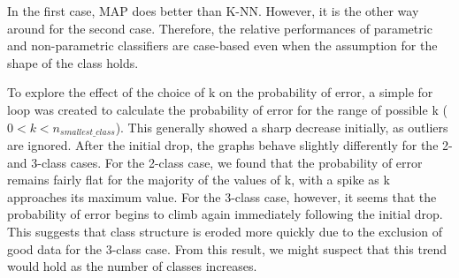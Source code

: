 In the first case, MAP does better than K-NN. However, it is the other way
around for the second case. Therefore, the relative performances of parametric 
and non-parametric classifiers are case-based even when the assumption for the 
shape of the class holds.

To explore the effect of the choice of k on the probability of error, a simple 
for loop was created to calculate the probability of error for the range 
of possible k ($0 < k < n_{smallest\_class}$).  This generally
showed a sharp decrease initially, as outliers are ignored.  After the initial drop, 
the graphs behave slightly differently for the 2- and 3-class cases.  For the 
2-class case, we found that the probability of error remains fairly flat for
the majority of the values of k, with a spike as k approaches its maximum
value. For the 3-class case, however, it seems that the probability of error 
begins to climb again immediately following the initial drop.  This suggests 
that class structure is eroded more quickly due to the exclusion of good data 
for the 3-class case.  From this result, we might suspect that this trend would
hold as the number of classes increases.
